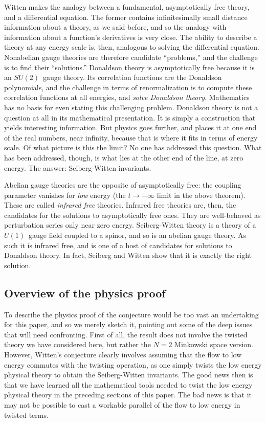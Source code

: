 \documentclass[twoside]{amsart}
\newcommand{\enm}[1]{\ensuremath{#1}}
\newcommand{\sut}{\enm{SU(2)}}
\newcommand{\uo}{\enm{U(1)}}
\begin{document}
Witten makes the analogy \cite{wittenias} between a fundamental,
asymptotically free theory, and a differential equation.  The former
contains
infinitesimally small distance information about a theory, as we said
before, and so the analogy with information about a function's
derivatives is very close.  The ability to describe a theory at any
energy scale is, then, analogous to solving the differential
equation.  Nonabelian gauge theories are therefore candidate
``problems,'' and the challenge is to find their ``solutions.''
Donaldson theory is asymptotically free because it is an \sut\ gauge
theory.  Its correlation functions are the Donaldson polynomials, and
the challenge in terms of renormalization is to compute these
correlation functions at all energies, and \emph{solve Donaldson
theory}.  Mathematics has no basis for even stating this challenging
problem.  Donaldson theory is not a question at all in its
mathematical presentation.  It is simply a construction that yields
interesting information.  But physics goes further, and places it at
one end of the real numbers, near infinity, because that is
where it fits in terms of energy scale.  Of what picture is this the
limit?  No one has addressed this question.  What has been
addressed, though, is what lies at the other end of the line, at zero
energy.  The answer: Seiberg-Witten invariants.

Abelian gauge theories are the opposite of asymptotically free: the
coupling parameter vanishes for \emph{low} energy (the \( t\to
-\infty \)
limit in the above theorem).  These are called \emph{infrared free}
theories.    Infrared free theories are, then,
the candidates for the solutions to asymptotically free ones.  They
are well-behaved as perturbation series only near zero energy.
Seiberg-Witten theory is a theory of a \uo\ gauge field coupled to a
spinor, and so is an abelian gauge theory.  As such it is infrared
free, and is one of a host of candidates for solutions to Donaldson
theory.  In fact, Seiberg and Witten show that it is
exactly the right solution.

\subsection{Overview of the physics proof}
To describe the physics proof of the conjecture would be too vast an
undertaking for this paper, and so we merely sketch it, pointing out
some of the deep issues that will need confronting.  First of all,
the result does not involve the twisted theory we
have considered here, but rather the \( N=2 \) Minkowski space
version.  However, Witten's conjecture clearly involves assuming
that the flow to low energy commutes with the twisting operation, as
one simply twists the low energy physical theory to obtain the
Seiberg-Witten invariants.  The good news then is that we have
learned all the mathematical tools needed to twist the low energy
physical theory in the preceding sections of this paper.  The bad news
is that it may not be possible to cast a workable parallel of the flow
to low energy in twisted terms.
\end{document}
